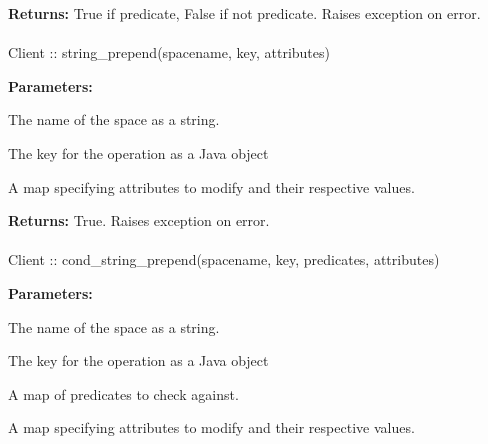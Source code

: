 \noindent\textbf{Returns:}
True if predicate, False if not predicate.  Raises exception on error.

\paragraph{}
\label{api:java:string_prepend}
\begin{javacode}
Client :: string_prepend(spacename, key, attributes)
\end{javacode}


\noindent\textbf{Parameters:}
\begin{description}[labelindent=\widthof{{\code{attributes}}},leftmargin=*,noitemsep,nolistsep,align=right]
\item[\code{spacename}] The name of the space as a string.
\item[\code{key}] The key for the operation as a Java object
\item[\code{attributes}] A map specifying attributes to modify and their respective values.
\end{description}

\noindent\textbf{Returns:}
True.  Raises exception on error.

\paragraph{}
\label{api:java:cond_string_prepend}
\begin{javacode}
Client :: cond_string_prepend(spacename, key, predicates, attributes)
\end{javacode}


\noindent\textbf{Parameters:}
\begin{description}[labelindent=\widthof{{\code{predicates}}},leftmargin=*,noitemsep,nolistsep,align=right]
\item[\code{spacename}] The name of the space as a string.
\item[\code{key}] The key for the operation as a Java object
\item[\code{predicates}] A map of predicates to check against.
\item[\code{attributes}] A map specifying attributes to modify and their respective values.
\end{description}

